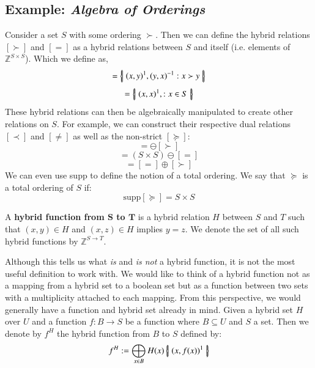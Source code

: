 \subsection{Example: \emph{Algebra of Orderings}}
Consider a set $S$ with some ordering $\succ$.
Then we can define the hybrid relations $[\succ]$ and $[=]$ as a hybrid relations between $S$ and itself 
(i.e. elements of $\mathbb{Z}^{S\times S}$).
Which we define as,
\begin{equation}
	[\succ] = \hset{ (x,y)^1, (y,x)^{-1} : x \succ y }
\end{equation}
\begin{equation}
	[=] = \hset{ (x,x)^1, : x \in S }
\end{equation}
These hybrid relations can then be algebraically manipulated to create other relations on $S$.
For example, we can construct their respective dual relations $[\prec]$ and $[\neq]$ as well as the non-strict $[\succeq]$:
\begin{equation}
	[\prec] = \ominus [\succ]
\end{equation}
\begin{equation}
	[\neq] = (S\times S) \ominus [=]
\end{equation}
\begin{equation}
	[\succeq] = [=] \oplus [\succ]
\end{equation}
We can even use supp to define the notion of a total ordering.
We say that $\succeq$ is a total ordering of $S$ if:
\begin{equation}
	\text{supp}[\succeq] = S \times S
\end{equation}


\newpage
\begin{definition}
	A \textbf{hybrid function from $\boldsymbol{S}$ to $\boldsymbol{T}$} is 
	a hybrid relation $H$ between $S$ and $T$ such that $(x,y) \in H$ and $(x,z) \in H$ implies $y=z$.
	We denote the set of all such hybrid functions by $\mathbb{Z}^{S \to T}$.
\end{definition}


Although this tells us what \emph{is} and \emph{is not} a hybrid function, it is not the most useful definition to work with. 
We would like to think of a hybrid function not as a mapping from a hybrid set to a boolean set but as
a function between two sets with a multiplicity attached to each mapping.
From this perspective, we would generally have a function and hybrid set already in mind.
Given a hybrid set $H$ over $U$ and a function $f:B \to S$ be a function where $B \subseteq U$ and $S$ a set.
Then we denote by $f^H$ the hybrid function from $B$ to $S$ defined by:
\begin{equation}
	f^H := \bigoplus_{x \in B} H(x) \left\{ \! \left| \;  (x, f(x) )^1  \; \right| \! \right\}
\end{equation}


